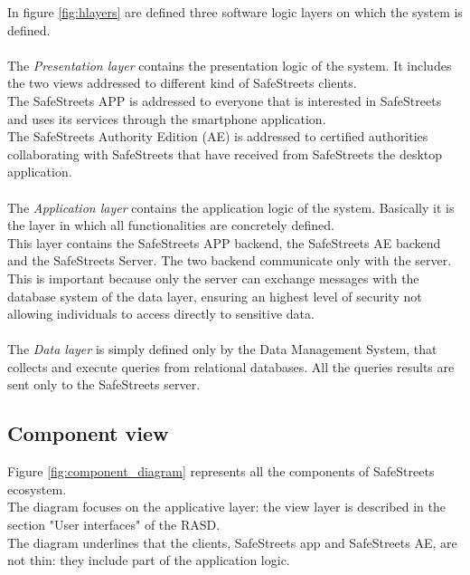 \documentclass{article}
\begin{document}
		In figure \ref{fig:hlayers}	are defined three software logic layers on which the system is defined. \\\\
		The \textit{Presentation layer} contains the presentation logic of the system. It includes the two views addressed to different kind of SafeStreets clients.\\ The SafeStreets APP is addressed to everyone that is interested in SafeStreets and uses its services through the smartphone application.\\
		The SafeStreets Authority Edition (AE) is addressed to certified authorities collaborating with SafeStreets that have received from SafeStreets the desktop application.\\\\The \textit{Application layer} contains the application logic of the system. Basically it is the layer in which all functionalities are concretely defined.  \\
		This layer contains the SafeStreets APP backend, the SafeStreets AE backend and the SafeStreets Server. The two backend communicate only with the server. This is important because only the server can exchange messages with the database system of the data layer, ensuring an highest level of security not allowing individuals to access directly to sensitive data.\\\\The \textit{Data layer} is simply defined only by the Data Management System, that collects and execute queries from relational databases. All the queries results are sent only to the SafeStreets server.
		
		\clearpage
		\subsection{Component view}
		Figure \ref{fig:component_diagram} represents all the components of SafeStreets ecosystem.\\
		The diagram focuses on the applicative layer: the view layer is described in the section "User interfaces" of the RASD.\\
		The diagram underlines that the clients, SafeStreets app and SafeStreets AE, are not thin: they include part of the application logic.\\
		
\end{document}
